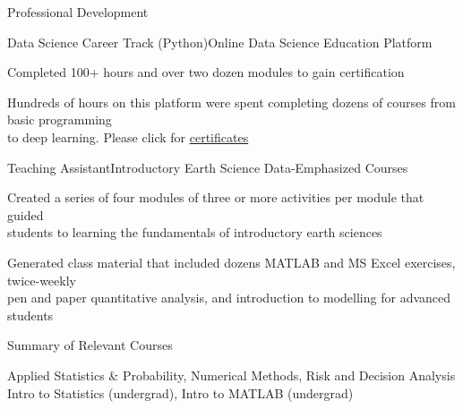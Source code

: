 \documentclass{resume} %
\begin{document}

\begin{rSection}{Professional Development} 

\begin{rSubsection}{Data Science Career Track (Python)}{}{Online Data Science Education Platform}{}
\item {Completed 100+ hours and over two dozen modules to gain certification}
\item {Hundreds of hours on this platform were spent completing dozens of courses from basic programming \\ to deep learning. Please click for \href{https://github.com/907Resident/Certifications}{certificates}}
\end{rSubsection}


\begin{rSubsection}{Teaching Assistant}{}{Introductory Earth Science Data-Emphasized Courses}{}
\item {Created a series of four modules of three or more activities per module that guided \\ students to learning the fundamentals of introductory earth sciences}
\item {Generated class material that included dozens MATLAB and MS Excel exercises, twice-weekly \\ pen and paper quantitative analysis, and introduction to modelling for advanced students}
\end{rSubsection}


\begin{rSubsection}{Summary of Relevant Courses}{}{}{}
\item {Applied Statistics \& Probability, Numerical Methods, Risk and Decision Analysis \\ Intro to Statistics (undergrad), Intro to MATLAB (undergrad)}

\end{rSubsection}


\end{rSection} 
\end{document}
